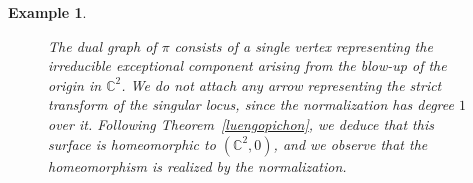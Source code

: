 \documentclass[reqno,dvipsnames,12pt]{amsart}
\newtheorem{exam}[thm]{Example}
\begin{document}
\begin{exam}
\begin{figure}[H]
  
  \caption{The dual graph of \(\pi\) consists of a single vertex representing the irreducible exceptional component arising from the blow-up of the origin in \(\mathbb{C}^2\). We do not attach any arrow representing the strict transform of the singular locus, since the normalization has degree \(1\) over it. Following Theorem~\ref{luengopichon}, we deduce that this surface is homeomorphic to \((\mathbb{C}^2,0)\), and we observe that the homeomorphism is  realized by the normalization.
 }
   \end{figure} 

   \end{exam}
\end{document}
